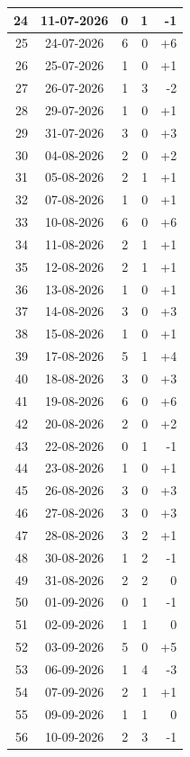 \begin{longtable}{|r|c|r|r|r|}
24 & 11-07-2026 & 0 & 1 & -1 \\ \hline
25 & 24-07-2026 & 6 & 0 & +6 \\ \hline
26 & 25-07-2026 & 1 & 0 & +1 \\ \hline
27 & 26-07-2026 & 1 & 3 & -2 \\ \hline
28 & 29-07-2026 & 1 & 0 & +1 \\ \hline
29 & 31-07-2026 & 3 & 0 & +3 \\ \hline
30 & 04-08-2026 & 2 & 0 & +2 \\ \hline
31 & 05-08-2026 & 2 & 1 & +1 \\ \hline
32 & 07-08-2026 & 1 & 0 & +1 \\ \hline
33 & 10-08-2026 & 6 & 0 & +6 \\ \hline
34 & 11-08-2026 & 2 & 1 & +1 \\ \hline
35 & 12-08-2026 & 2 & 1 & +1 \\ \hline
36 & 13-08-2026 & 1 & 0 & +1 \\ \hline
37 & 14-08-2026 & 3 & 0 & +3 \\ \hline
38 & 15-08-2026 & 1 & 0 & +1 \\ \hline
39 & 17-08-2026 & 5 & 1 & +4 \\ \hline
40 & 18-08-2026 & 3 & 0 & +3 \\ \hline
41 & 19-08-2026 & 6 & 0 & +6 \\ \hline
42 & 20-08-2026 & 2 & 0 & +2 \\ \hline
43 & 22-08-2026 & 0 & 1 & -1 \\ \hline
44 & 23-08-2026 & 1 & 0 & +1 \\ \hline
45 & 26-08-2026 & 3 & 0 & +3 \\ \hline
46 & 27-08-2026 & 3 & 0 & +3 \\ \hline
47 & 28-08-2026 & 3 & 2 & +1 \\ \hline
48 & 30-08-2026 & 1 & 2 & -1 \\ \hline
49 & 31-08-2026 & 2 & 2 & 0 \\ \hline
50 & 01-09-2026 & 0 & 1 & -1 \\ \hline
51 & 02-09-2026 & 1 & 1 & 0 \\ \hline
52 & 03-09-2026 & 5 & 0 & +5 \\ \hline
53 & 06-09-2026 & 1 & 4 & -3 \\ \hline
54 & 07-09-2026 & 2 & 1 & +1 \\ \hline
55 & 09-09-2026 & 1 & 1 & 0 \\ \hline
56 & 10-09-2026 & 2 & 3 & -1 \\ \hline

\end{longtable}
